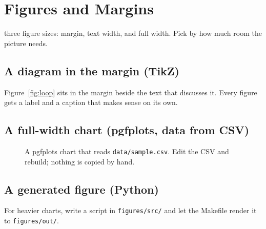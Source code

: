 \chapter{Figures and Margins}\label{ch:figs}

 three figure sizes: margin, text width, and
full width. Pick by how much room the picture needs.

\section{A diagram in the margin (TikZ)}

\begin{marginfigure}
  \caption{The writing loop.}\label{fig:loop}
\end{marginfigure}

Figure~\ref{fig:loop} sits in the margin beside the text that discusses it.
Every figure gets a label and a caption that makes sense on its own.

\section{A full-width chart (pgfplots, data from CSV)}

\begin{figure}
  \caption{A pgfplots chart that reads \texttt{data/sample.csv}. Edit the CSV
  and rebuild; nothing is copied by hand.}\label{fig:pgf}
\end{figure}

\section{A generated figure (Python)}

For heavier charts, write a script in \texttt{figures/src/} and let the
Makefile render it to \texttt{figures/out/}.

